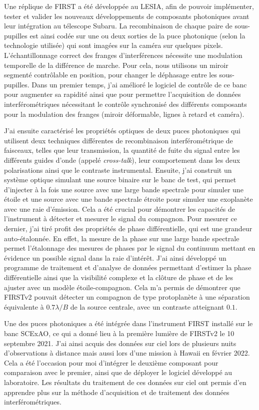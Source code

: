 Une réplique de FIRST a été développée au \ac{LESIA}, afin de pouvoir implémenter, tester et valider les nouveaux développements de composants photoniques avant leur intégration au télescope Subaru. La recombinaison de chaque paire de sous-pupilles est ainsi codée sur une ou deux sorties de la puce photonique (selon la technologie utilisée) qui sont imagées sur la caméra sur quelques pixels. L'échantillonnage correct des franges d'interférences nécessite une modulation temporelle de la différence de marche. Pour cela, nous utilisons un miroir segmenté contrôlable en position, pour changer le déphasage entre les sous-pupilles. Dans un premier temps, j'ai amélioré le logiciel de contrôle de ce banc pour augmenter sa rapidité ainsi que pour permettre l'acquisition de données interférométriques nécessitant le contrôle synchronisé des différents composants pour la modulation des franges (miroir déformable, lignes à retard et caméra).

J'ai ensuite caractérisé les propriétés optiques de deux puces photoniques qui utilisent deux techniques différentes de recombinaison interférométrique de faisceaux, telles que leur transmission, la quantité de fuite du signal entre les différents guides d'onde (appelé \textit{cross-talk}), leur comportement dans les deux polarisations ainsi que le contraste instrumental. Ensuite, j'ai construit un système optique simulant une source binaire sur le banc de test, qui permet d'injecter à la fois une source avec une large bande spectrale pour simuler une étoile et une source avec une bande spectrale étroite pour simuler une exoplanète avec une raie d'émission. Cela a été crucial pour démontrer les capacités de l'instrument à détecter et mesurer le signal du compagnon. Pour mesurer ce dernier, j'ai tiré profit des propriétés de phase différentielle, qui est une grandeur auto-étalonnée. En effet, la mesure de la phase sur une large bande spectrale permet l'étalonnage des mesures de phases par le signal du continuum mettant en évidence un possible signal dans la raie d'intérêt. J'ai ainsi développé un programme de traitement et d'analyse de données permettant d'estimer la phase différentielle ainsi que la visibilité complexe et la clôture de phase et de les ajuster avec un modèle étoile-compagnon. Cela m'a permis de démontrer que FIRSTv2 pouvait détecter un compagnon de type protoplanète à une séparation équivalente à $0.7 \lambda / B$ de la source centrale, avec un contraste atteignant $0.1$.

Une des puces photoniques a été intégrée dans l'instrument FIRST installé sur le banc SCExAO, ce qui a donné lieu à la première lumière de FIRSTv2 le 10 septembre 2021. J'ai ainsi acquis des données sur ciel lors de plusieurs nuits d'observations à distance mais aussi lors d'une mission à Hawaii en février 2022. Cela a été l'occasion pour moi d'intégrer le deuxième composant pour comparaison avec le premier, ainsi que de déployer le logiciel développé au laboratoire. Les résultats du traitement de ces données sur ciel ont permis d'en apprendre plus sur la méthode d'acquisition et de traitement des données interférométriques.

